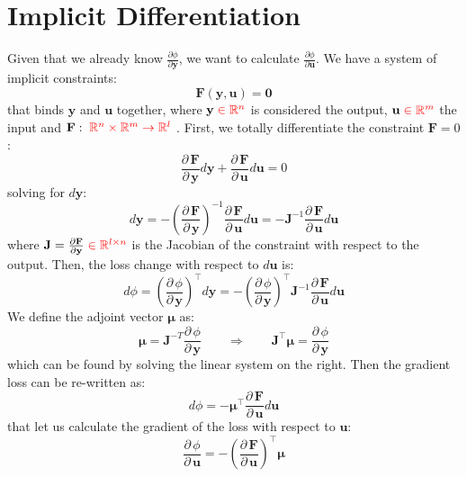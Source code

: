 \documentclass{article}
\newcommand{\pd}[2]{\dfrac{\partial\, #1}{\partial\, #2}}
\newcommand{\pdc}[2]{\frac{\partial #1}{\partial #2}}
\newcommand{\red}[1]{\textcolor{red}{#1}}
\begin{document}
\newpage

\section{Implicit Differentiation}
\label{sec:implicit_diff}

Given that we already know $\pdc{\phi}{\mathbf{y}}$, we want to calculate $\pdc{\phi}{\mathbf{u}}$. We have a system of implicit constraints:
\begin{equation*}
    \mathbf{F}(\mathbf{y}, \mathbf{u}) = \mathbf{0}
\end{equation*}
that binds $\mathbf{y}$ and $\mathbf{u}$ together, where $\mathbf{y}\;\red{\in \mathbb{R}^{n}}$ is considered the output, $\mathbf{u}\;\red{\in \mathbb{R}^{m}}$ the input and $\mathbf{F}:\;\red{\mathbb{R}^{n}  \times \mathbb{R}^{m} \rightarrow \mathbb{R}^{l}}$ .
\newline First, we totally differentiate the constraint $\mathbf{F} = 0$:
\begin{equation}
    \pd{\mathbf{F}}{\mathbf{y}}d\mathbf{y} + \pd{\mathbf{F}}{\mathbf{u}}d\mathbf{u} = 0
\end{equation}
solving for $d\mathbf{y}$:
\begin{equation*}
    d\mathbf{y} = 
    - \left(\pd{\mathbf{F}}{\mathbf{y}}\right)^{-1}\pd{\mathbf{F}}{\mathbf{u}}d\mathbf{u} = 
    -\mathbf{J}^{-1}\pd{\mathbf{F}}{\mathbf{u}}d\mathbf{u}
\end{equation*}
where $\mathbf{J} = \pdc{\mathbf{F}}{\mathbf{y}}\;\red{\in \mathbb{R}^{l\times n}}$ is the Jacobian of the constraint with respect to the output. Then, the loss change with respect to $d\mathbf{u}$ is:
\begin{equation*}
d\phi = 
    \left(\pd{\phi}{\mathbf{y}}\right)^\top d\mathbf{y} = 
    - \left(\pd{\phi}{\mathbf{y}}\right)^\top \mathbf{J}^{-1}\pd{\mathbf{F}}{\mathbf{u}}d\mathbf{u}
\end{equation*}
We define the adjoint vector $\boldsymbol{\mu}$ as:
\begin{equation}
\boldsymbol{\mu} = \mathbf{J}^{-T} \pd{\phi}{\mathbf{y}}
\qquad
\Longrightarrow
\qquad
\mathbf{J}^\top \boldsymbol{\mu} = \pd{\phi}{\mathbf{y}}
\end{equation}
which can be found by solving the linear system on the right. 
\newline Then the gradient loss can be re-written as:
\begin{equation*}
d\phi = -\boldsymbol{\mu}^\top \pd{\mathbf{F}}{\mathbf{u}} d\mathbf{u}
\end{equation*}
that let us calculate the gradient of the loss with respect to $\mathbf{u}$:
\begin{equation}
    \pd{\phi}{\mathbf{u}} = - \left( \pd{\mathbf{F}}{\mathbf{u}} \right)^\top \boldsymbol{\mu}
\end{equation}
\end{document}
